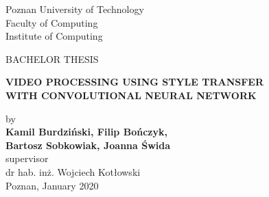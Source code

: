 
\begin{titlepage}
	
	
	\thispagestyle{frontpage}
	
	\begin{center}
		

		\vspace{0,5\baselineskip}
		\large{Poznan University of Technology}\\
		\large{Faculty of Computing}\\
        \large{Institute of Computing}\\
        
        \vspace*{4,5\baselineskip}
        
	    \large {BACHELOR THESIS}\\
		\vspace*{1,5\baselineskip}
		
		\LARGE{\textbf{VIDEO PROCESSING USING STYLE TRANSFER}}\\
		\Large{\textbf{WITH CONVOLUTIONAL NEURAL NETWORK}}\\
		
        \vspace*{1,5\baselineskip}

        \large{by}\\
		\large{\textbf{Kamil Burdziński, Filip Bończyk, \\Bartosz Sobkowiak, Joanna Świda}}\\
		\vspace{1,5\baselineskip}
		\large{supervisor}\\
		\large{{dr hab. inż. Wojciech Kotłowski }}\\
		
		\vspace*{\fill}
		\large{{Poznan, January 2020}}\\



	\end{center}
	
	\vspace*{4\baselineskip}

	
\end{titlepage}